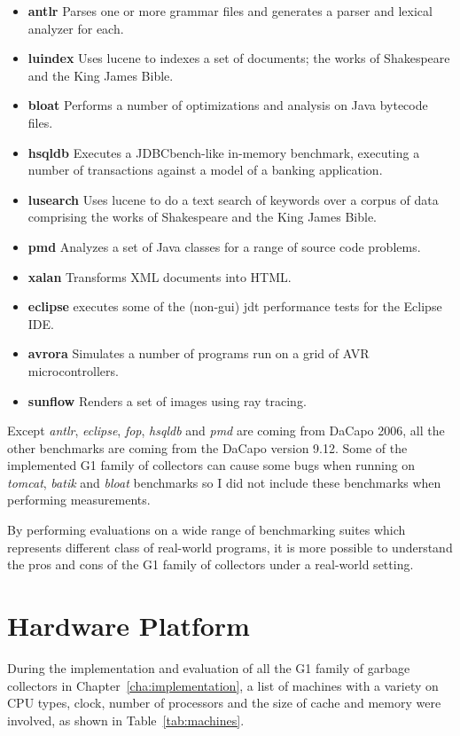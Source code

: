 \begin{itemize}
  \item \textbf{antlr} Parses one or more grammar files and generates a parser and lexical analyzer for each.
  \item \textbf{luindex} Uses lucene to indexes a set of documents; the works of Shakespeare and the King James Bible.
  \item \textbf{bloat} Performs a number of optimizations and analysis on Java bytecode files.
  \item \textbf{hsqldb} Executes a JDBCbench-like in-memory benchmark, executing a number of transactions against a model of a banking application.
  \item \textbf{lusearch} Uses lucene to do a text search of keywords over a corpus of data comprising the works of Shakespeare and the King James Bible.
  \item \textbf{pmd} Analyzes a set of Java classes for a range of source code problems.
  \item \textbf{xalan} Transforms XML documents into HTML.
  \item \textbf{eclipse} executes some of the (non-gui) jdt performance tests for the Eclipse IDE.
  \item \textbf{avrora} Simulates a number of programs run on a grid of AVR microcontrollers.
  \item \textbf{sunflow} Renders a set of images using ray tracing.
\end{itemize}

Except \textit{antlr}, \textit{eclipse}, \textit{fop}, \textit{hsqldb} and \textit{pmd} are coming from
DaCapo 2006, all the other benchmarks are coming from the DaCapo version 9.12.
Some of the implemented G1 family of collectors can cause some bugs when running on
\textit{tomcat}, \textit{batik} and \textit{bloat} benchmarks so I did not include
these benchmarks when performing measurements.

By performing evaluations on a wide range of benchmarking suites which represents different
class of real-world programs, it is more possible to understand the pros and cons
of the G1 family of collectors under a real-world setting.

\section{Hardware Platform} %
\label{sec:hardware}

During the implementation and evaluation of all the G1 family of garbage collectors in Chapter~\ref{cha:implementation},
a list of machines with a variety on CPU types, clock, number of processors and
the size of cache and memory were involved, as shown in Table~\ref{tab:machines}.

